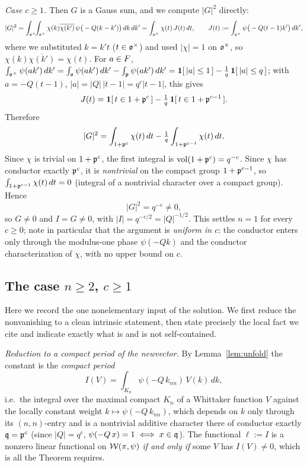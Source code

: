 \emph{Case $c\ge1$.} Then $G$ is a Gauss sum, and we compute $|G|^2$ directly:
\[
|G|^2=\int_{\mathfrak{o}^\times}\!\!\int_{\mathfrak{o}^\times}\chi(k)\overline{\chi(k')}\,
\psi\big(-Q(k-k')\big)\,dk\,dk'
=\int_{\mathfrak{o}^\times}\chi(t)\,J(t)\,dt,\qquad
J(t):=\int_{\mathfrak{o}^\times}\psi\big(-Q(t-1)k'\big)\,dk',
\]
where we substituted $k=k't$ \textup{(}$t\in\mathfrak{o}^\times$\textup{)} and used $|\chi|=1$ on
$\mathfrak{o}^\times$, so $\chi(k)\overline{\chi(k')}=\chi(t)$. For $a\in F$,
$\int_{\mathfrak{o}^\times}\psi(ak')\,dk'=\int_{\mathfrak{o}}\psi(ak')\,dk'-\int_{\mathfrak{p}}\psi(ak')\,dk'
=\mathbf 1[\,|a|\le1\,]-\tfrac1q\,\mathbf 1[\,|a|\le q\,]$; with $a=-Q(t-1)$, $|a|=|Q|\,|t-1|=q^{c}|t-1|$,
this gives
\[
J(t)=\mathbf 1[\,t\in1+\mathfrak{p}^{c}\,]-\tfrac1q\,\mathbf 1[\,t\in1+\mathfrak{p}^{c-1}\,].
\]
Therefore
\[
|G|^2=\int_{1+\mathfrak{p}^{c}}\chi(t)\,dt-\tfrac1q\int_{1+\mathfrak{p}^{c-1}}\chi(t)\,dt .
\]
Since $\chi$ is trivial on $1+\mathfrak{p}^{c}$, the first integral is
$\operatorname{vol}(1+\mathfrak{p}^{c})=q^{-c}$. Since $\chi$ has conductor exactly $\mathfrak{p}^{c}$, it is
\emph{nontrivial} on the compact group $1+\mathfrak{p}^{c-1}$, so $\int_{1+\mathfrak{p}^{c-1}}\chi(t)\,dt=0$
\textup{(}integral of a nontrivial character over a compact group\textup{)}. Hence
\[
|G|^2=q^{-c}\neq0,
\]
so $G\neq0$ and $I=G\neq0$, with $|I|=q^{-c/2}=|Q|^{-1/2}$. This settles $n=1$ for every $c\ge0$;
note in particular that the argument is \emph{uniform in $c$}: the conductor enters only through
the modulus-one phase $\psi(-Qk)$ and the conductor characterization of $\chi$, with no upper
bound on $c$.

\subsection*{The case $n\ge2$, $c\ge1$}
Here we record the one nonelementary input of the solution. We first reduce the nonvanishing to a
clean intrinsic statement, then state precisely the local fact we cite and indicate exactly what is
and is not self-contained.

\medskip
\noindent\emph{Reduction to a compact period of the newvector.} By Lemma~\ref{lem:unfold} the
constant is the \emph{compact period}
\[
I(V)=\int_{K_n}\psi(-Q\,k_{nn})\,V(k)\,dk,
\]
i.e.\ the integral over the maximal compact $K_n$ of a Whittaker function $V$ against the
locally constant weight $k\mapsto\psi(-Q\,k_{nn})$, which depends on $k$ only through its
$(n,n)$-entry and is a nontrivial additive character there of conductor exactly $\mathfrak{q}=\mathfrak{p}^c$
\textup{(}since $|Q|=q^c$, $\psi(-Q\,x)=1\iff x\in\mathfrak{q}$\textup{)}. The functional $\ell:=I$ is a
nonzero linear functional on $\mathcal{W}(\pi,\psi)$ \emph{if and only if} some $V$ has $I(V)\ne0$, which
is all the Theorem requires.

